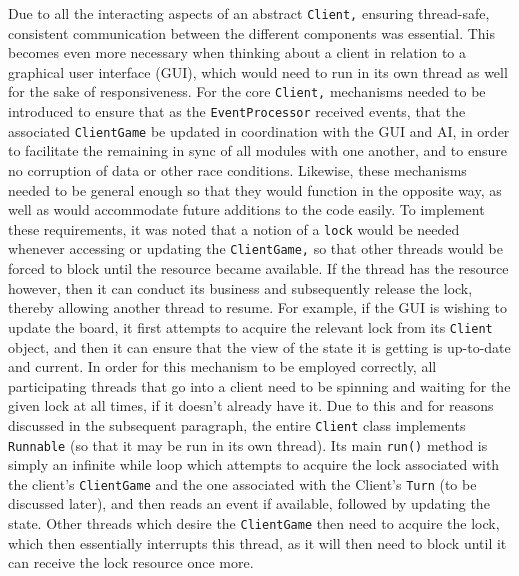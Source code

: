 \documentclass[a4paper,doc]{apa6}
\newcommand{\code}{\texttt}
\begin{document}
Due to all the interacting aspects of an abstract \code{Client,} ensuring thread-safe, consistent communication between the different components was essential. This becomes even more necessary when thinking about a client in relation to a graphical user interface (GUI), which would need to run in its own thread as well for the sake of responsiveness. For the core \code{Client,} mechanisms needed to be introduced to ensure that as the \code{EventProcessor} received events, that the associated \code{ClientGame} be updated in coordination with the GUI and AI, in order to facilitate the remaining in sync of all modules with one another, and to ensure no corruption of data or other race conditions. Likewise, these mechanisms needed to be general enough so that they would function in the opposite way, as well as would accommodate future additions to the code easily. To implement these requirements, it was noted that a notion of a \code{lock} would be needed whenever accessing or updating the \code{ClientGame,} so that other threads would be forced to block until the resource became available. If the thread has the resource however, then it can conduct its business and subsequently release the lock, thereby allowing another thread to resume. For example, if the GUI is wishing to update the board, it first attempts to acquire the relevant lock from its \code{Client} object, and then it can ensure that the view of the state it is getting is up-to-date and current. In order for this mechanism to be employed correctly, all participating threads that go into a client need to be spinning and waiting for the given lock at all times, if it doesn’t already have it. Due to this and for reasons discussed in the subsequent paragraph, the entire \code{Client} class implements \code{Runnable} (so that it may be run in its own thread). Its main \code{run()} method is simply an infinite while loop which attempts to acquire the lock associated with the client’s \code{ClientGame} and the one associated with the Client’s \code{Turn} (to be discussed later), and then reads an event if available, followed by updating the state. Other threads which desire the \code{ClientGame} then need to acquire the lock, which then essentially interrupts this thread, as it will then need to block until it can receive the lock resource once more.
\end{document}
